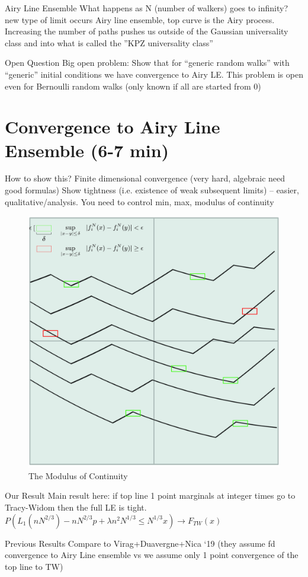 \documentclass[9pt,t]{beamer}
\begin{document}
\begin{frame}{Airy Line Ensemble}
What happens as N (number of walkers) goes to infinity? new type of limit occurs Airy line ensemble, top curve is the Airy process. Increasing the number of paths pushes us outside of the Gaussian universality class and into what is called the ”KPZ universality class”
\end{frame}
\begin{frame}{Open Question}
Big open problem: Show that for “generic random walks” with “generic” initial conditions we have convergence to Airy LE. This problem is open even for Bernoulli random walks (only known if all are started from 0)
\end{frame}

\section{Convergence to Airy Line Ensemble (6-7 min)}
\begin{frame}{How to show this?}
Finite dimensional convergence (very hard, algebraic need good formulas)
Show tightness (i.e. existence of weak subsequent limits) -- easier, qualitative/analysis. You need to control min, max, modulus of continuity
\begin{figure}
	\includegraphics[height=0.5\textheight]{graphics/TempModulusCont.jpg}
	\caption{The Modulus of Continuity}
\end{figure}

\end{frame}
\begin{frame}{Our Result}
Main result here: if top line 1 point marginals at integer times go to Tracy-Widom then the full LE is tight. 
$P(L_1(nN^{2/3}) - nN^{2/3} p + \lambda n^2 N^{1/3} \leq N^{1/3} x) \to F_{TW}(x)$
\end{frame}
\begin{frame}{Previous Results}
Compare to Virag+Duavergne+Nica ‘19 (they assume fd convergence to Airy Line ensemble vs we assume only 1 point convergence of the top line to TW)
\end{frame}
\end{document}
